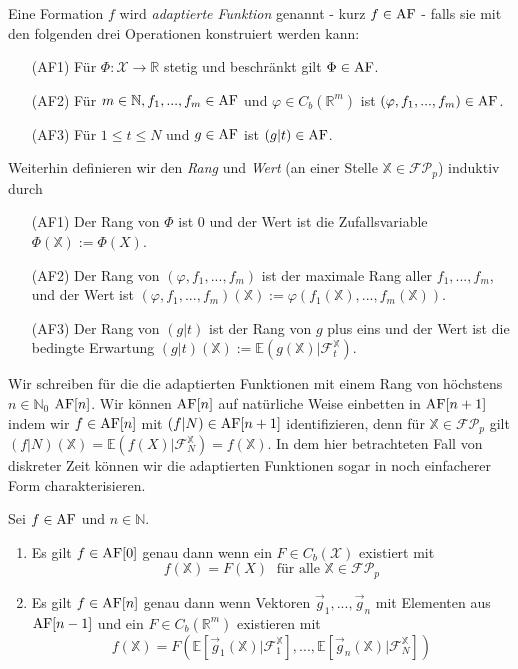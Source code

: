 
\begin{definition}
Eine Formation $f$ wird \emph{adaptierte Funktion} genannt - kurz $f \in \operatorname{AF}$ - falls sie mit den folgenden drei Operationen konstruiert werden kann:
\begin{enumerate}
    \item[(AF1)] Für $\Phi: \mathcal{X} \rightarrow \mathbb{R}$ stetig und beschränkt gilt $\Phi \in \operatorname{AF}$.
    \item[(AF2)] Für $m \in \mathbb{N}, f_1,...,f_m \in \operatorname{AF}$ und $\varphi \in C_b(\mathbb{R}^m)$ ist $(\varphi, f_1, ..., f_m) \in \operatorname{AF}$.
    \item[(AF3)] Für $1\leq t \leq N$ und $g \in \operatorname{AF}$ ist $(g \vert t) \in \operatorname{AF}$.
\end{enumerate}
Weiterhin definieren wir den \emph{Rang} und \emph{Wert} (an einer Stelle $\mathbb{X} \in \mathcal{FP}_p$) induktiv durch 
\begin{enumerate}
    \item[(AF1)] Der Rang von $\Phi$ ist $0$ und der Wert ist die Zufallsvariable $\Phi(\mathbb{X}):=\Phi(X)$.
    \item[(AF2)] Der Rang von $(\varphi, f_1,...,f_m)$ ist der maximale Rang aller $f_1,...,f_m$, und der Wert ist $(\varphi, f_1,...,f_m)(\mathbb{X}):=\varphi(f_1(\mathbb{X}), ..., f_m(\mathbb{X}))$.
    \item[(AF3)] Der Rang von $(g \vert t)$ ist der Rang von $g$ plus eins und der Wert ist die bedingte Erwartung $(g\vert t)(\mathbb{X}) := \mathbb{E}(g(\mathbb{X}) \vert \mathcal{F}_t^\mathbb{X})$.
\end{enumerate}
\end{definition}
Wir schreiben für die die adaptierten Funktionen mit einem Rang von höchstens $n \in \mathbb{N}_0$ $\operatorname{AF}[n]$. Wir können $\operatorname{AF}[n]$ auf natürliche Weise einbetten in $\operatorname{AF}[n+1]$ indem wir $f \in \operatorname{AF}[n]$ mit $(f \vert N) \in \operatorname{AF}[n+1]$ identifizieren, denn für $\mathbb{X} \in \mathcal{FP}_p$ gilt $(f \vert N)(\mathbb{X}) = \mathbb{E}(f(X) \vert \mathcal{F}_N^\mathbb{X}) = f(\mathbb{X})$. In dem hier betrachteten Fall von diskreter Zeit können wir die adaptierten Funktionen sogar in noch einfacherer Form charakterisieren.
\begin{lemma}\label{thm:adapted_functions_char}
Sei $f \in \operatorname{AF}$ und $n \in \mathbb{N}$. 
\begin{enumerate}
    \item Es gilt $f \in \operatorname{AF}[0]$ genau dann wenn ein $F \in C_b(\mathcal{X})$ existiert mit 
    $$f(\mathbb{X}) = F(X)\; \text{ für alle } \mathbb{X} \in \mathcal{FP}_p$$ 
    \item Es gilt $f \in \operatorname{AF}[n]$ genau dann wenn Vektoren $\vec{g}_1,...,\vec{g}_n$ mit Elementen aus $\operatorname{AF}[n-1]$ und ein $F \in C_b(\mathbb{R}^m)$ existieren mit 
    $$f(\mathbb{X}) = F(\mathbb{E}[\vec{g}_1(\mathbb{X}) \vert \mathcal{F}_1^\mathbb{X}], ..., \mathbb{E}[\vec{g}_n(\mathbb{X}) \vert \mathcal{F}_N^{\mathbb{X}}])$$
\end{enumerate}
\end{lemma}
